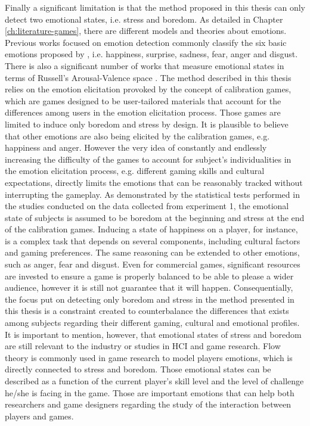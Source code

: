 Finally a significant limitation is that the method proposed in this thesis can only detect two emotional states, i.e. stress and boredom. As detailed in Chapter \ref{ch:literature-games}, there are different models and theories about emotions. Previous works focused on emotion detection commonly classify the six basic emotions proposed by \textcite{ekman1971constants}, i.e. happiness, surprise, sadness, fear, anger and disgust. There is also a significant number of works that measure emotional states in terms of Russell's Arousal-Valence space \parencite{russell1978evidence}. The method described in this thesis relies on the emotion elicitation provoked by the concept of calibration games, which are games designed to be user-tailored materials that account for the differences among users in the emotion elicitation process. Those games are limited to induce only boredom and stress by design. It is plausible to believe that other emotions are also being elicited by the calibration games, e.g. happiness and anger. However the very idea of constantly and endlessly increasing the difficulty of the games to account for subject's individualities in the emotion elicitation process, e.g. different gaming skills and cultural expectations, directly limits the emotions that can be reasonably tracked without interrupting the gameplay. As demonstrated by the statistical tests performed in the studies conducted on the data collected from experiment 1, the emotional state of subjects is assumed to be boredom at the beginning and stress at the end of the calibration games. Inducing a state of happiness on a player, for instance, is a complex task that depends on several components, including cultural factors and gaming preferences. The same reasoning can be extended to other emotions, such as anger, fear and disgust. Even for commercial games, significant resources are invested to ensure a game is properly balanced to be able to please a wider audience, however it is still not guarantee that it will happen. Consequentially, the focus put on detecting only boredom and stress in the method presented in this thesis is a constraint created to counterbalance the differences that exists among subjects regarding their different gaming, cultural and emotional profiles. It is important to mention, however, that emotional states of stress and boredom are still relevant to the industry or studies in HCI and game research. Flow theory is commonly used in game research to model players emotions, which is directly connected to stress and boredom. Those emotional states can be described as a function of the current player's skill level and the level of challenge he/she is facing in the game. Those are important emotions that can help both researchers and game designers regarding the study of the interaction between players and games.

